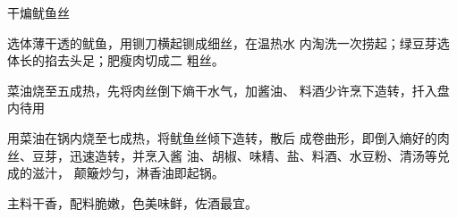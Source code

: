 \begin{recipe}{干煸鱿鱼丝}

\ingredients


\cooking

\step 选体薄干透的鱿鱼，用铡刀横起铡成细丝，在温热水 内淘洗一次捞起；绿豆芽选体长的掐去头足；肥瘦肉切成二 粗丝。

\step 菜油烧至五成热，先将肉丝倒下熵干水气，加酱油、 料酒少许烹下造转，扦入盘内待用

\step 用菜油在锅内烧至七成热，将鱿鱼丝倾下造转，散后 成卷曲形，即倒入熵好的肉丝、豆芽，迅速造转，并烹入酱 油、胡椒、味精、盐、料酒、水豆粉、清汤等兑成的滋汁， 颠簸炒匀，淋香油即起锅。

\notes

主料干香，配料脆嫩，色美味鲜，佐酒最宜。

\end{recipe}


